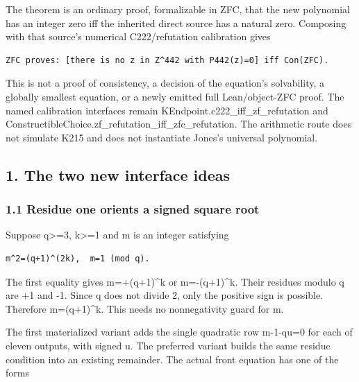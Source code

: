 The theorem is an ordinary proof, formalizable in ZFC, that the new polynomial has an integer zero iff the inherited direct source has a natural zero. Composing with that source's numerical C222/\allowbreak{}refutation calibration gives



\begin{verbatim}
ZFC proves: [there is no z in Z^442 with P442(z)=0] iff Con(ZFC).
\end{verbatim}

This is not a proof of consistency, a decision of the equation's solvability, a globally smallest equation, or a newly emitted full Lean/\allowbreak{}object-ZFC proof. The named calibration interfaces remain KEndpoint.c222\_\allowbreak{}iff\_\allowbreak{}zf\_\allowbreak{}refutation and ConstructibleChoice.zf\_\allowbreak{}refutation\_\allowbreak{}iff\_\allowbreak{}zfc\_\allowbreak{}refutation. The arithmetic route does not simulate K215 and does not instantiate Jones's universal polynomial.



\subsection*{1. The two new interface ideas}



\subsubsection*{1.1 Residue one orients a signed square root}



Suppose q\textgreater{}\allowbreak{}=\allowbreak{}3, k\textgreater{}\allowbreak{}=\allowbreak{}1 and m is an integer satisfying



\begin{verbatim}
m^2=(q+1)^(2k),  m=1 (mod q).
\end{verbatim}

The first equality gives m=\allowbreak{}+\allowbreak{}(q+\allowbreak{}1)\textasciicircum{}\allowbreak{}k or m=\allowbreak{}-(q+\allowbreak{}1)\textasciicircum{}\allowbreak{}k. Their residues modulo q are +\allowbreak{}1 and -1. Since q does not divide 2, only the positive sign is possible. Therefore m=\allowbreak{}(q+\allowbreak{}1)\textasciicircum{}\allowbreak{}k. This needs no nonnegativity guard for m.



The first materialized variant adds the single quadratic row m-1-q\textasteriskcentered{}\allowbreak{}u=\allowbreak{}0 for each of eleven outputs, with signed u. The preferred variant builds the same residue condition into an existing remainder. The actual front equation has one of the forms



